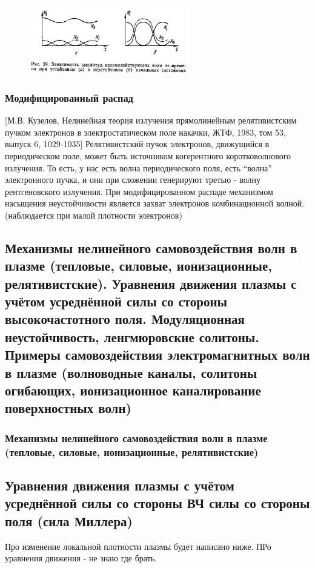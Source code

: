 \documentclass[10pt, a4paper]{article}
\begin{document}
\begin{figure}[h!]
	\begin{center}
		\includegraphics[width=70mm]{Wavetrans2.JPG}
	\end{center}
\end{figure}

\subsubsection{Модифицированный распад}
[М.В. Кузелов, Нелинейная теория излучения прямолинейным релятивистским пучком электронов в электростатическом поле накачки, ЖТФ, 1983, том 53, выпуск 6, 1029-1035]
Релятивистский пучок электронов, движущийся в периодическом поле, может быть источником когерентного коротковолнового излучения.
То есть, у нас есть волна периодического поля, есть “волна” электронного пучка, и они при сложении генерируют третью - волну рентгеновского излучения. 
При  модифицированном распаде механизмом насыщения неустойчивости является захват электронов комбинационной волной.(наблюдается при малой плотности электронов)




\subsection{Механизмы нелинейного самовоздействия волн в плазме (тепловые, силовые, ионизационные, релятивистские). Уравнения движения плазмы с учётом усреднённой силы со стороны высокочастотного поля. Модуляционная неустойчивость, ленгмюровские солитоны. Примеры самовоздействия электромагнитных волн в плазме (волноводные каналы, солитоны огибающих, ионизационное каналирование поверхностных волн)}


\subsubsection{Механизмы нелинейного самовоздействия волн в плазме (тепловые, силовые, ионизационные, релятивистские)}

\subsection{Уравнения движения плазмы с учётом усреднённой силы со стороны ВЧ силы со стороны поля (сила Миллера)}
Про изменение локальной плотности плазмы будет написано ниже. ПРо уравнения движения - не знаю где брать.
\end{document}
